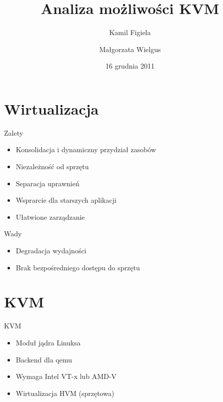 \documentclass{beamer}
\title[\insertframenumber/\inserttotalframenumber]{Analiza możliwości KVM}
\institute[AGH]{AGH University of Science and Technology, Kraków}
\author[K. Figiela, M. Wielgus]{Kamil Figiela \and Małgorzata Wielgus}
\date{16 grudnia 2011}
\begin{document}
\begin{frame}[plain]
  \titlepage
\end{frame}

\section{Wirtualizacja}

\begin{frame}{Zalety}
  \begin{itemize}
    \item Konsolidacja i dynamiczny przydział zasobów
    \item Niezależność od sprzętu
    \item Separacja uprawnień
    \item Wsprarcie dla starszych aplikacji
    \item Ułatwione zarządzanie
  \end{itemize}
\end{frame}
  
\begin{frame}{Wady}
  \begin{itemize}
    \item Degradacja wydajności
    \item Brak bezpośredniego dostępu do sprzętu
  \end{itemize}
\end{frame}

\section{KVM}
\begin{frame}{KVM}
  \begin{itemize}
    \item Moduł jądra Linuksa
    \item Backend dla qemu
    \item Wymaga Intel VT-x lub AMD-V
    \item Wirtualizacja HVM (sprzętowa)    
  \end{itemize}
\end{frame}
\end{document}
